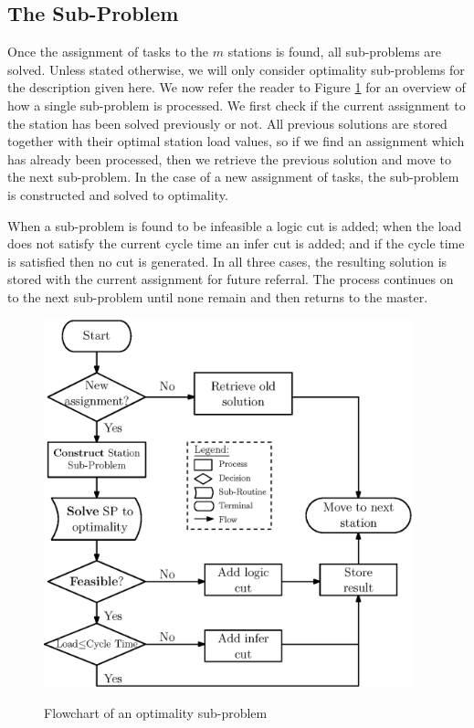 \subsection{The Sub-Problem}
\label{sec:bend:algSP}
Once the assignment of tasks to the $m$ stations is found,
all sub-problems are solved.
Unless stated otherwise, we will only consider optimality sub-problems
for the description given here.
We now refer the reader to Figure \ref{fig:bend:SPflowchart}
for an overview of how a single sub-problem is processed.
We first check if the current assignment to the station
has been solved previously or not.
All previous solutions are stored together with their optimal station
load values, so if we find an assignment which has already been processed,
then we retrieve the previous solution and move to the next sub-problem.
In the case of a new assignment of tasks, the sub-problem
is constructed and solved to optimality.

When a sub-problem is found to be infeasible a logic cut
is added; when the load does not satisfy the current cycle time
an infer cut is added; and if the cycle time is satisfied then
no cut is generated.
In all three cases, the resulting solution is stored with
the current assignment for future referral.
The process continues on to the next sub-problem until none remain and
then returns to the master.

\begin{figure}[tbp]
	\centering
	\caption{Flowchart of an optimality sub-problem}
	\vspace{2mm}
	\includegraphics[width=0.95\textwidth]{images/Optimality-SP-Flowchart.eps}
	\label{fig:bend:SPflowchart}
\end{figure}

